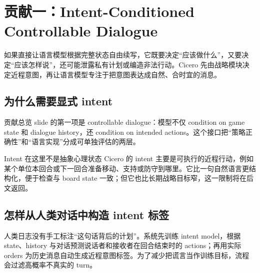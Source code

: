 \section{贡献一：Intent-Conditioned Controllable Dialogue}

如果直接让语言模型根据完整状态自由续写，它既要决定“应该做什么”，又要决定“应该怎样说”，还可能泄露私有计划或编造非法行动。Cicero 先由战略模块决定近程意图，再让语言模型专注于把意图表达成自然、合时宜的消息。

\subsection{为什么需要显式 intent}

贡献总览 slide 的第一项是 controllable dialogue：模型不仅 condition on game state 和 dialogue history，还 condition on intended actions。这个接口把“策略正确性”和“语言实现”分成可单独评估的两层。


\begin{knowledgebox}{Intent 在这里不是抽象心理状态}
Cicero 的 intent 主要是可执行的近程行动，例如某个单位本回合或下一回合准备移动、支持或防守到哪里。它比一句自然语言更结构化，便于检查与 board state 一致；但它也比长期战略目标窄，这一限制将在后文返回。
\end{knowledgebox}

\subsection{怎样从人类对话中构造 intent 标签}

人类日志没有手工标注“这句话背后的计划”。系统先训练 intent model，根据 state、history 与对话预测说话者和接收者在回合结束时的 actions；再用实际 orders 为历史消息自动生成近程意图标签。为了减少把谎言当作训练目标，流程会过滤高概率不真实的 turn。




